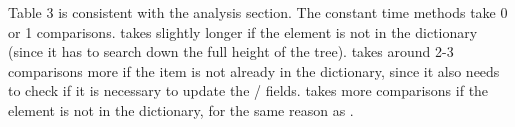 Table 3 is consistent with the analysis section. The constant time methods take 0 or 1 comparisons.  takes slightly longer if the element is not in the dictionary (since it has to search down the full height of the tree).  takes around 2-3 comparisons more if the item is not already in the dictionary, since it also needs to check if it is necessary to update the / fields.  takes more comparisons if the element is not in the dictionary, for the same reason as .